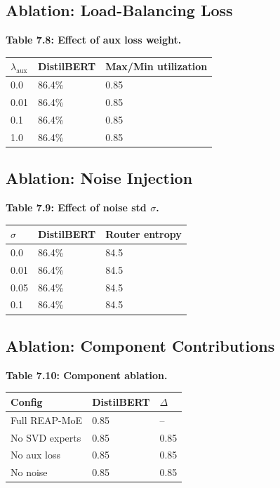 \subsection{Ablation: Load-Balancing Loss}

\textbf{Table 7.8: Effect of aux loss weight.}

\begin{table}[H]
\centering
\small
\begin{tabular}{lll}
\toprule
\textbf{$\lambda_\text{aux}$} & \textbf{DistilBERT} & \textbf{Max/Min utilization} \\
\midrule
0.0 & 86.4\% & 0.85 \\
0.01 & 86.4\% & 0.85 \\
0.1 & 86.4\% & 0.85 \\
1.0 & 86.4\% & 0.85 \\
\bottomrule
\end{tabular}
\end{table}

\subsection{Ablation: Noise Injection}

\textbf{Table 7.9: Effect of noise std $\sigma$.}

\begin{table}[H]
\centering
\small
\begin{tabular}{lll}
\toprule
\textbf{$\sigma$} & \textbf{DistilBERT} & \textbf{Router entropy} \\
\midrule
0.0 & 86.4\% & 84.5 \\
0.01 & 86.4\% & 84.5 \\
0.05 & 86.4\% & 84.5 \\
0.1 & 86.4\% & 84.5 \\
\bottomrule
\end{tabular}
\end{table}

\subsection{Ablation: Component Contributions}

\textbf{Table 7.10: Component ablation.}

\begin{table}[H]
\centering
\small
\begin{tabular}{lll}
\toprule
\textbf{Config} & \textbf{DistilBERT} & \textbf{$\Delta$} \\
\midrule
Full REAP-MoE & 0.85 & -- \\
No SVD experts & 0.85 & 0.85 \\
No aux loss & 0.85 & 0.85 \\
No noise & 0.85 & 0.85 \\
\bottomrule
\end{tabular}
\end{table}

